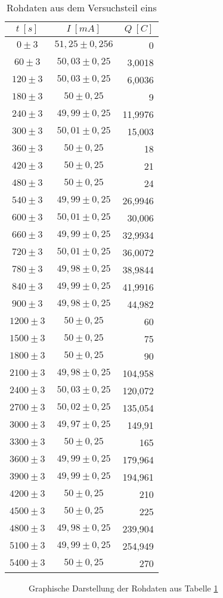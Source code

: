 \begin{table}
\centering
\begin{tabular}{ccr}
$t\ [s]$& $I\ [mA]$		& $Q\ [C]$\\
\hline 
$0\pm 3$ 	& $51,25\pm0,256$	& 0\\
$60\pm 3$ 	& $50,03\pm0,25 $	& 3,0018\\
$120\pm 3$ 	& $50,03\pm0,25 $	& 6,0036\\
$180\pm 3$ 	& $50\pm0,25 	$	& 9\\
$240\pm 3$ 	& $49,99\pm0,25 $	& 11,9976\\
$300\pm 3$ 	& $50,01\pm0,25 $	& 15,003\\
$360\pm 3$ 	& $50\pm0,25 	$	& 18\\
$420\pm 3$ 	& $50\pm0,25 	$	& 21\\
$480\pm 3$ 	& $50\pm0,25 	$	& 24\\
$540\pm 3$ 	& $49,99\pm0,25 $	& 26,9946\\
$600\pm 3$ 	& $50,01\pm0,25 $	& 30,006\\
$660\pm 3$ 	& $49,99\pm0,25 $	& 32,9934\\
$720\pm 3$ 	& $50,01\pm0,25 $	& 36,0072\\
$780\pm 3$ 	& $49,98\pm0,25 $	& 38,9844\\
$840\pm 3$ 	& $49,99\pm0,25 $	& 41,9916\\
$900\pm 3$ 	& $49,98\pm0,25 $	& 44,982\\
$1200\pm 3$	& $50\pm0,25 	$	& 60\\
$1500\pm 3$ 	& $50\pm0,25 	$	& 75\\
$1800\pm 3$ 	& $50\pm0,25 	$	& 90\\
$2100\pm 3$ 	& $49,98\pm0,25 $	& 104,958\\
$2400\pm 3$ 	& $50,03\pm0,25 $	& 120,072\\
$2700\pm 3$ 	& $50,02\pm0,25 $	& 135,054\\
$3000\pm 3$ 	& $49,97\pm0,25 $	& 149,91\\
$3300\pm 3$ 	& $50\pm0,25 	$	& 165\\
$3600\pm 3$ 	& $49,99\pm0,25 $	& 179,964\\
$3900\pm 3$ 	& $49,99\pm0,25 $	& 194,961\\
$4200\pm 3$ 	& $50\pm0,25 	$	& 210\\
$4500\pm 3$ 	& $50\pm0,25 	$	& 225\\
$4800\pm 3$ 	& $49,98\pm0,25 $	& 239,904\\
$5100\pm 3$ 	& $49,99\pm0,25 $	& 254,949\\
$5400\pm 3$ 	& $50\pm0,25 	$	& 270\\
\end{tabular}
\caption{Rohdaten aus dem Versuchsteil eins}
\label{T1}
\end{table}
\newpage
\begin{figure}[H]
\centering

\caption{Graphische Darstellung der Rohdaten aus Tabelle \ref{T1}}
\label{abb1}
\end{figure}


